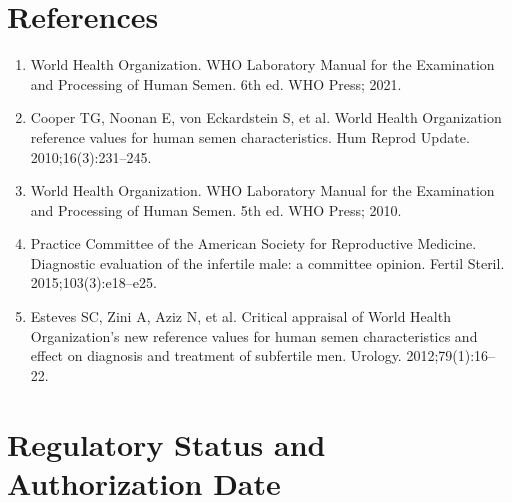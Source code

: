 \section*{References}
\begin{enumerate}
  \item World Health Organization. WHO Laboratory Manual for the Examination and Processing of Human Semen. 6th ed. WHO Press; 2021.
  \item Cooper TG, Noonan E, von Eckardstein S, et al. World Health Organization reference values for human semen characteristics. Hum Reprod Update. 2010;16(3):231--245.
  \item World Health Organization. WHO Laboratory Manual for the Examination and Processing of Human Semen. 5th ed. WHO Press; 2010.
  \item Practice Committee of the American Society for Reproductive Medicine. Diagnostic evaluation of the infertile male: a committee opinion. Fertil Steril. 2015;103(3):e18--e25.
  \item Esteves SC, Zini A, Aziz N, et al. Critical appraisal of World Health Organization's new reference values for human semen characteristics and effect on diagnosis and treatment of subfertile men. Urology. 2012;79(1):16--22.
\end{enumerate}
\clearpage
\section*{Regulatory Status and Authorization Date}

\clearpage
